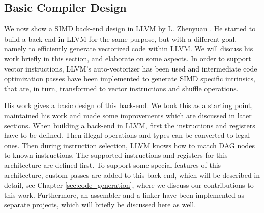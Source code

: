  


\subsection{Basic Compiler Design}\label{sec:basic_compiler_design}
We now show a SIMD back-end design in LLVM by L. Zhenyuan \cite{liu_zhenyuan}. He started to build a back-end in LLVM for the same purpose, but with a different goal, namely to efficiently generate vectorized code within LLVM. We will discuss his work briefly in this section, and elaborate on some aspects. In order to support vector instructions, LLVM's auto-vectorizer has been used and intermediate code optimization passes have been implemented to generate SIMD specific intrinsics, that are, in turn, transformed to vector instructions and shuffle operations. 

His work gives a basic design of this back-end. We took this as a starting point, maintained his work and made some improvements which are discussed in later sections. When building a back-end in LLVM, first the instructions and registers have to be defined. Then illegal operations and types can be converted to legal ones. Then during instruction selection, LLVM knows how to match DAG nodes to known instructions. The supported instructions and registers for this architecture are defined first. To support some special features of this architecture, custom passes are added to this back-end, which will be described in detail, see Chapter \ref{sec:code_generation}, where we discuss our contributions to this work. Furthermore, an assembler and a linker have been implemented as separate projects, which will briefly be discussed here as well.

